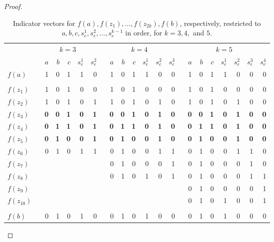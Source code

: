 \documentclass[11pt, a4paper]{article}
\begin{document}
\begin{proof}
\begin{table}
\centering
\begin{tabular} {l||rrr|rr||rrr|rrr||rrr|rrrr} 
& \multicolumn{5}{c||}{$k=3$} & \multicolumn{6}{c||}{$k=4$} & \multicolumn{7}{c}{$k=5$}\\
&$~~~~a$& $b$& $c$& $s_e^1$& $s_e^2$					&$~~~~a$& $b$& $c$& $s_e^1$& $s_e^2$&$s_e^3$			&$~~~~a$& $b$& $c$& $s_e^1$& $s_e^2$&$s_e^3$&$s_e^4$\\
\hline \hline
$f(a)$& 1&0&1&1&0											&1&0&1&1&0&0													&1&0&1&1&0&0&0\\
&&&&& &&&&&& &&&&&&&\\
$f(z_1)$& 1&0&1&0&0										&1&0&1&0&0&0													&1&0&1&0&0&0 &0\\
$f(z_2)$& 1&0&1&0&1										&1&0&1&0&1&0													&1&0&1&0&1&0&0\\
$f(z_3)$& {\bf 0}&{\bf 0} &{\bf 1} & {\bf 0} &{\bf 1}	&{\bf 0}&{\bf 0} &{\bf 1} & {\bf 0} &{\bf 1} & {\bf 0}	&{\bf 0}&{\bf 0} &{\bf 1} & {\bf 0} &{\bf 1} & {\bf 0} &{\bf 0}\\
$f(z_4)$& {\bf 0}&{\bf 1} &{\bf 1} & {\bf 0} &{\bf 1}	&{\bf 0}&{\bf 1} &{\bf 1} & {\bf 0} &{\bf 1}& {\bf 0}		&{\bf 0}&{\bf 1} &{\bf 1} & {\bf 0} &{\bf 1}& {\bf 0}&{\bf 0}\\
$f(z_5)$& {\bf 0}&{\bf 1} &{\bf 0} & {\bf 0} &{\bf 1}	&{\bf 0}&{\bf 1} &{\bf 0} & {\bf 0} &{\bf 1}& {\bf 0}		&{\bf 0}&{\bf 1} &{\bf 0} & {\bf 0} &{\bf 1}& {\bf 0}&{\bf 0} \\
$f(z_6)$& 0&1&0&1&1										&0&1&0&0&1&1													&0&1&0&0&1&1&0\\
$f(z_7)$& &&&&												&0&1&0&0& 0&1													&0&1&0&0& 0&1&0\\
$f(z_8)$& &&&&												&0&1&0& 1& 0&1												&0&1&0&0& 0&1&1\\
$f(z_9)$& &&&&												& &&&&&															&0&1&0&0& 0&0&1\\
$f(z_{10})$& &&&&											& &&&&&															&0&1&0& 1& 0&0&1\\
&&&&& &&&&&& &&&&&&&\\
$f(b)$& 0&1&0&1&0											&0&1&0& 1& 0&0												&0&1&0& 1& 0&0&0
\end{tabular} 



\caption{Indicator vectors for $f(a), f(z_1), \ldots, f(z_{2k}), f(b)$, respectively, restricted to $a, b, c, s_e^1, s_e^2,  \ldots, s_e^{k-1}$ in order, for $k=3, 4, $ and $5$.\label{Knn}}
\end{table}
\vskip 1cm


\end{proof}
\end{document}
